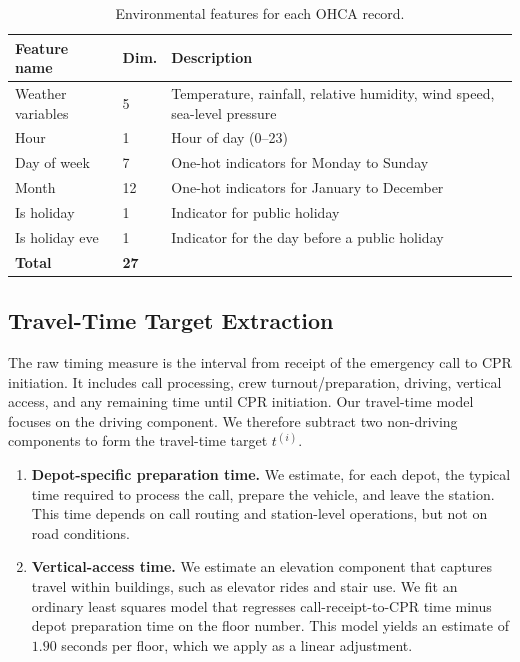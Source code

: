 \documentclass[11pt, letterpaper, oneside, reqno]{amsart}
\begin{document}
\begin{table}[h]
\centering
\small
\caption{Environmental features for each OHCA record.}
\begin{tabularx}{\textwidth}{llX}
\hline
\textbf{Feature name} & \textbf{Dim.} & \textbf{Description} \\
\hline
Weather variables & 5 & Temperature, rainfall, relative humidity, wind speed, sea-level pressure \\
Hour & 1 & Hour of day (0--23) \\
Day of week & 7 & One-hot indicators for Monday to Sunday \\
Month & 12 & One-hot indicators for January to December \\
Is holiday & 1 & Indicator for public holiday \\
Is holiday eve & 1 & Indicator for the day before a public holiday \\
\hline
\textbf{Total} & \textbf{27} & \\
\hline
\end{tabularx}
\label{tab:environmental_features}
\end{table}

\subsection{Travel-Time Target Extraction}
\label{ec:travel-time-target}

The raw timing measure is the interval from receipt of the emergency call to CPR initiation. It includes call processing, crew turnout/preparation, driving, vertical access, and any remaining time until CPR initiation. Our travel-time model focuses on the driving component. We therefore subtract two non-driving components to form the travel-time target $t^{(i)}$.

\begin{enumerate}[leftmargin=7mm]
\item \textbf{Depot-specific preparation time.} We estimate, for each depot, the typical time required to process the call, prepare the vehicle, and leave the station. This time depends on call routing and station-level operations, but not on road conditions.
\item \textbf{Vertical-access time.} We estimate an elevation component that captures travel within buildings, such as elevator rides and stair use. We fit an ordinary least squares model that regresses call-receipt-to-CPR time minus depot preparation time on the floor number. This model yields an estimate of $1.90$ seconds per floor, which we apply as a linear adjustment.
\end{enumerate}
\end{document}
